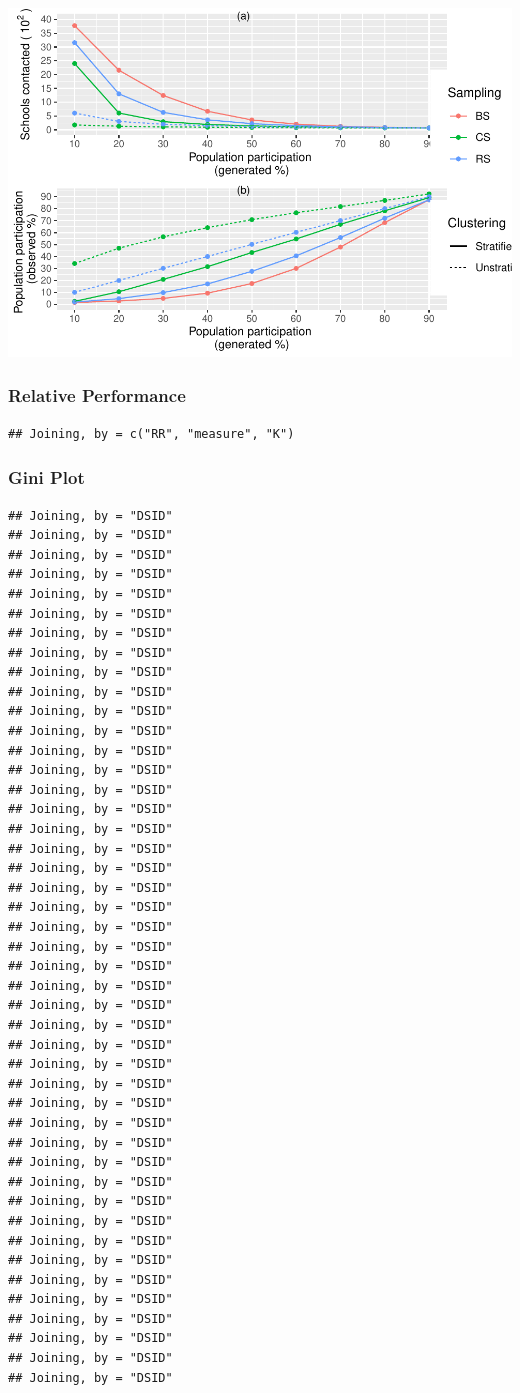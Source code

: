 \documentclass[
  english,
  man,floatsintext]{apa6}
\begin{document}
\includegraphics{5---Analysis_files/figure-latex/unnamed-chunk-29-1.pdf}

\hypertarget{relative-performance}{%
\subsubsection{Relative Performance}\label{relative-performance}}

\begin{verbatim}
## Joining, by = c("RR", "measure", "K")
\end{verbatim}

\hypertarget{gini-plot}{%
\subsubsection{Gini Plot}\label{gini-plot}}

\begin{verbatim}
## Joining, by = "DSID"
## Joining, by = "DSID"
## Joining, by = "DSID"
## Joining, by = "DSID"
## Joining, by = "DSID"
## Joining, by = "DSID"
## Joining, by = "DSID"
## Joining, by = "DSID"
## Joining, by = "DSID"
## Joining, by = "DSID"
## Joining, by = "DSID"
## Joining, by = "DSID"
## Joining, by = "DSID"
## Joining, by = "DSID"
## Joining, by = "DSID"
## Joining, by = "DSID"
## Joining, by = "DSID"
## Joining, by = "DSID"
## Joining, by = "DSID"
## Joining, by = "DSID"
## Joining, by = "DSID"
## Joining, by = "DSID"
## Joining, by = "DSID"
## Joining, by = "DSID"
## Joining, by = "DSID"
## Joining, by = "DSID"
## Joining, by = "DSID"
## Joining, by = "DSID"
## Joining, by = "DSID"
## Joining, by = "DSID"
## Joining, by = "DSID"
## Joining, by = "DSID"
## Joining, by = "DSID"
## Joining, by = "DSID"
## Joining, by = "DSID"
## Joining, by = "DSID"
## Joining, by = "DSID"
## Joining, by = "DSID"
## Joining, by = "DSID"
## Joining, by = "DSID"
## Joining, by = "DSID"
## Joining, by = "DSID"
## Joining, by = "DSID"
## Joining, by = "DSID"
## Joining, by = "DSID"
\end{verbatim}
\end{document}
